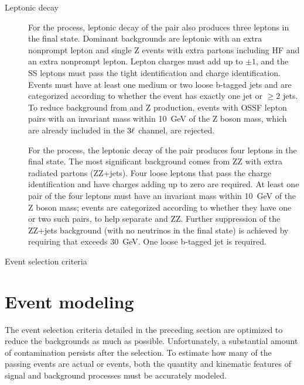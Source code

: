 \begin{description}
  \item[Leptonic \ttbar decay] For the \ttW process, leptonic decay of the
    \ttbar pair also produces three leptons in the final state. Dominant
    backgrounds are leptonic \ttbar with an extra nonprompt lepton and single Z
    events with extra partons including HF and an extra nonprompt lepton. Lepton
    charges must add up to $\pm1$, and the SS leptons must pass the tight
    identification and charge identification. Events must have at least one
    medium or two loose b-tagged jets and are categorized according to whether
    the event has exactly one jet or $\ge2$ jets.  To reduce background from
    \ttZ and Z production, events with OSSF lepton pairs with an invariant mass
    within \SI{10}{GeV} of the Z boson mass, which are already included in the
    $3{\ell}$ \ttZ channel, are rejected.

    For the \ttZ process, the leptonic decay of the \ttbar pair produces four
    leptons in the final state. The most significant background comes from ZZ
    with extra radiated partons (ZZ+jets). Four loose leptons that pass the
    charge identification and have charges adding up to zero are required. At
    least one pair of the four leptons must have an invariant mass within
    \SI{10}{GeV} of the Z boson mass; events are categorized according to
    whether they have one or two such pairs, to help separate \ttZ and ZZ.
    Further suppression of the ZZ+jets background (with no neutrinos in the
    final state) is achieved by requiring that \HTmiss exceeds \SI{30}{GeV}. One
    loose b-tagged jet is required.
\end{description}

\begin{table}
  \caption{Event selection criteria}
  \label{tab:event_selection}
  
\end{table}

\section{Event modeling}
\label{sec:8-modeling}
The event selection criteria detailed in the preceding section are optimized to
reduce the backgrounds as much as possible. Unfortunately, a substantial amount
of contamination persists after the selection. To estimate how many of the
passing events are actual \ttW or \ttZ events, both the quantity and kinematic
features of signal and background processes must be accurately  modeled.


